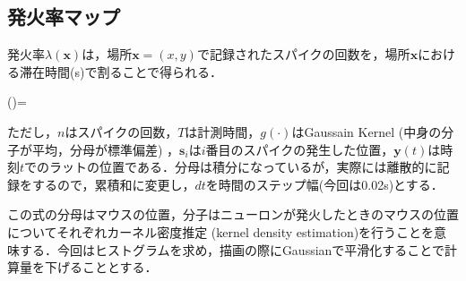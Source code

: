 \subsection{発火率マップ}

発火率$\lambda(\boldsymbol{x})$は，場所$\boldsymbol{x}=(x,y)$で記録されたスパイクの回数を，場所$\boldsymbol{x}$における滞在時間(s)で割ることで得られる． 

 
\lambda()= 
 

ただし，$n$はスパイクの回数，$T$は計測時間，$g(\cdot)$はGaussain
Kernel (中身の分子が平均，分母が標準偏差) ，$\boldsymbol{s}_i$は$i$番目のスパイクの発生した位置，$\boldsymbol{y}(t)$は時刻$t$でのラットの位置である．分母は積分になっているが，実際には離散的に記録をするので，累積和に変更し，$dt$を時間のステップ幅(今回は0.02s)とする．

この式の分母はマウスの位置，分子はニューロンが発火したときのマウスの位置についてそれぞれカーネル密度推定 (kernel density estimation)を行うことを意味する．今回はヒストグラムを求め，描画の際にGaussianで平滑化することで計算量を下げることとする．
